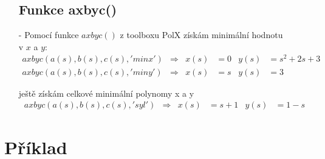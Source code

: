 \documentclass{article}
\begin{document}
\begin{itemize}
    
    \subsection{Funkce axbyc()}
    \item[-] Pomocí funkce $axbyc()$ z toolboxu PolX získám minimální hodnotu\\ v $x$ a $y$:
    \begin{align*}
        axbyc(a(s),b(s),c(s),'minx') & \Rightarrow & x(s) &= 0 & y(s) &= s^2+2s+3\\
        axbyc(a(s),b(s),c(s),'miny') & \Rightarrow & x(s) &= s & y(s) &= 3
    \end{align*}
    
    \item[] ještě získám celkové minimální polynomy x a y
    \begin{align*}
        axbyc(a(s),b(s),c(s),'syl') & \Rightarrow & x(s) &= s+1 & y(s) &= 1-s
    \end{align*}
    
\end{itemize}




\section{Příklad}
\end{document}
